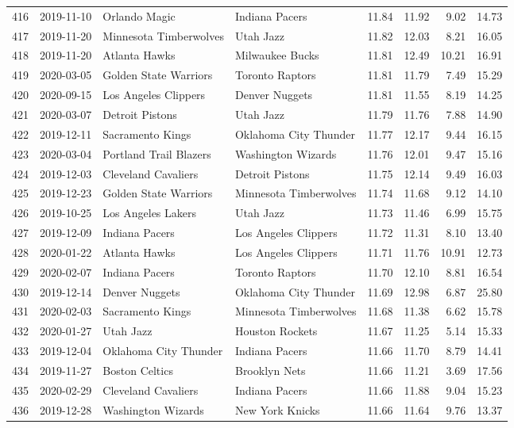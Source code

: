\documentclass[
  11pt,
]{article}
\theoremstyle{nonumberplain}
\begin{document}
\begin{longtable}{rl|llr|rrr}
416 & 2019-11-10 & Orlando Magic & Indiana Pacers & 11.84 & 11.92 & 9.02 & 14.73\\
417 & 2019-11-20 & Minnesota Timberwolves & Utah Jazz & 11.82 & 12.03 & 8.21 & 16.05\\
418 & 2019-11-20 & Atlanta Hawks & Milwaukee Bucks & 11.81 & 12.49 & 10.21 & 16.91\\
419 & 2020-03-05 & Golden State Warriors & Toronto Raptors & 11.81 & 11.79 & 7.49 & 15.29\\
420 & 2020-09-15 & Los Angeles Clippers & Denver Nuggets & 11.81 & 11.55 & 8.19 & 14.25\\
421 & 2020-03-07 & Detroit Pistons & Utah Jazz & 11.79 & 11.76 & 7.88 & 14.90\\
422 & 2019-12-11 & Sacramento Kings & Oklahoma City Thunder & 11.77 & 12.17 & 9.44 & 16.15\\
423 & 2020-03-04 & Portland Trail Blazers & Washington Wizards & 11.76 & 12.01 & 9.47 & 15.16\\
424 & 2019-12-03 & Cleveland Cavaliers & Detroit Pistons & 11.75 & 12.14 & 9.49 & 16.03\\
425 & 2019-12-23 & Golden State Warriors & Minnesota Timberwolves & 11.74 & 11.68 & 9.12 & 14.10\\
426 & 2019-10-25 & Los Angeles Lakers & Utah Jazz & 11.73 & 11.46 & 6.99 & 15.75\\
427 & 2019-12-09 & Indiana Pacers & Los Angeles Clippers & 11.72 & 11.31 & 8.10 & 13.40\\
428 & 2020-01-22 & Atlanta Hawks & Los Angeles Clippers & 11.71 & 11.76 & 10.91 & 12.73\\
429 & 2020-02-07 & Indiana Pacers & Toronto Raptors & 11.70 & 12.10 & 8.81 & 16.54\\
430 & 2019-12-14 & Denver Nuggets & Oklahoma City Thunder & 11.69 & 12.98 & 6.87 & 25.80\\
431 & 2020-02-03 & Sacramento Kings & Minnesota Timberwolves & 11.68 & 11.38 & 6.62 & 15.78\\
432 & 2020-01-27 & Utah Jazz & Houston Rockets & 11.67 & 11.25 & 5.14 & 15.33\\
433 & 2019-12-04 & Oklahoma City Thunder & Indiana Pacers & 11.66 & 11.70 & 8.79 & 14.41\\
434 & 2019-11-27 & Boston Celtics & Brooklyn Nets & 11.66 & 11.21 & 3.69 & 17.56\\
435 & 2020-02-29 & Cleveland Cavaliers & Indiana Pacers & 11.66 & 11.88 & 9.04 & 15.23\\
436 & 2019-12-28 & Washington Wizards & New York Knicks & 11.66 & 11.64 & 9.76 & 13.37\\

\end{longtable}
\end{document}
